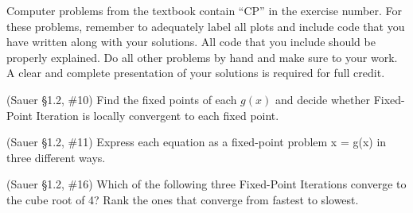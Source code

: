 \documentclass[12pt,fleqn]{exam}
\begin{document}
Computer problems from the textbook contain ``CP'' in the exercise number. For these problems, remember to adequately label all plots and include code that you have written along with your solutions. All code that you include should be properly explained. Do all other problems by hand and make sure to your work. A clear and complete presentation of your solutions is required for full credit.

\begin{questions}

\question (Sauer \S1.2, \#10) Find the fixed points of each $g(x)$ and decide whether Fixed-Point Iteration is locally convergent to each fixed point.


\question (Sauer \S1.2, \#11) Express each equation as a fixed-point problem x = g(x) in three different ways.


\question (Sauer \S1.2, \#16) Which of the following three Fixed-Point Iterations converge to the cube root of 4? Rank the ones that converge from fastest to slowest.

\end{questions}
\end{document}

